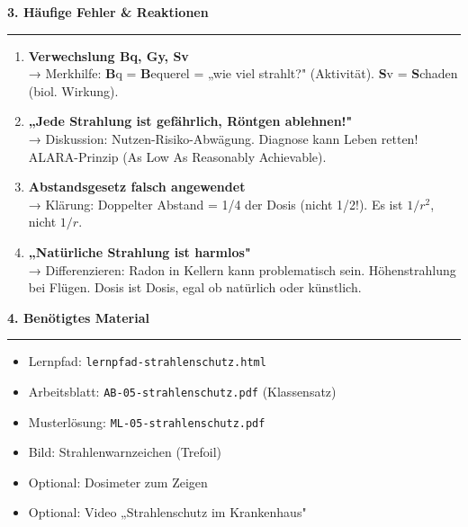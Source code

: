 \documentclass[11pt, a4paper]{article}
\newcommand{\abschnitt}[1]{%
    \vspace{10pt}\noindent\textbf{\textcolor{physik}{\large #1}}\vspace{6pt}\hrule\vspace{8pt}
}
\begin{document}
\vspace{12pt}

\abschnitt{3. Häufige Fehler \& Reaktionen}

\begin{warnbox}
\begin{enumerate}
\item \textbf{Verwechslung Bq, Gy, Sv}\\
→ Merkhilfe: \textbf{B}q = \textbf{B}equerel = „wie viel strahlt?" (Aktivität). \textbf{S}v = \textbf{S}chaden (biol. Wirkung).

\item \textbf{„Jede Strahlung ist gefährlich, Röntgen ablehnen!"}\\
→ Diskussion: Nutzen-Risiko-Abwägung. Diagnose kann Leben retten! ALARA-Prinzip (As Low As Reasonably Achievable).

\item \textbf{Abstandsgesetz falsch angewendet}\\
→ Klärung: Doppelter Abstand = 1/4 der Dosis (nicht 1/2!). Es ist $1/r^2$, nicht $1/r$.

\item \textbf{„Natürliche Strahlung ist harmlos"}\\
→ Differenzieren: Radon in Kellern kann problematisch sein. Höhenstrahlung bei Flügen. Dosis ist Dosis, egal ob natürlich oder künstlich.
\end{enumerate}
\end{warnbox}

\vspace{12pt}

\abschnitt{4. Benötigtes Material}

\begin{itemize}
\item Lernpfad: \texttt{lernpfad-strahlenschutz.html}
\item Arbeitsblatt: \texttt{AB-05-strahlenschutz.pdf} (Klassensatz)
\item Musterlösung: \texttt{ML-05-strahlenschutz.pdf}
\item Bild: Strahlenwarnzeichen (Trefoil)
\item Optional: Dosimeter zum Zeigen
\item Optional: Video „Strahlenschutz im Krankenhaus"
\end{itemize}

\vspace{12pt}
\end{document}
